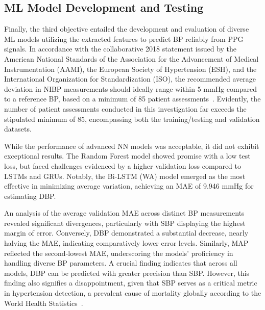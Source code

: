\subsection{ML Model Development and Testing}
\label{subsec:ml-model-development-and-testing}

Finally, the third objective entailed the development and evaluation of diverse ML models utilizing the extracted features to predict BP reliably from PPG signals.
In accordance with the collaborative 2018 statement issued by the American National Standards of the Association for the Advancement of Medical Instrumentation (AAMI), the European Society of Hypertension (ESH), and the International Organization for Standardization (ISO),
the recommended average deviation in NIBP measurements should ideally range within 5 mmHg compared to a reference BP, based on a minimum of 85 patient assessments~\cite{stergiouUniversalStandardValidation2018}.
Evidently, the number of patient assessments conducted in this investigation far exceeds the stipulated minimum of 85, encompassing both the training/testing and validation datasets.

While the performance of advanced NN models was acceptable, it did not exhibit exceptional results.
The Random Forest model showed promise with a low test loss, but faced challenges evidenced by a higher validation loss compared to LSTMs and GRUs.
Notably, the Bi-LSTM (WA) model emerged as the most effective in minimizing average variation, achieving an MAE of 9.946 mmHg for estimating DBP\@.

An analysis of the average validation MAE across distinct BP measurements revealed significant divergences, particularly with SBP displaying the highest margin of error.
Conversely, DBP demonstrated a substantial decrease, nearly halving the MAE, indicating comparatively lower error levels.
Similarly, MAP reflected the second-lowest MAE, underscoring the models' proficiency in handling diverse BP parameters.
A crucial finding indicates that across all models, DBP can be predicted with greater precision than SBP\@.
However, this finding also signifies a disappointment, given that SBP serves as a critical metric in hypertension detection,
a prevalent cause of mortality globally according to the World Health Statistics~\cite{WorldHealthStatistics2023}.

